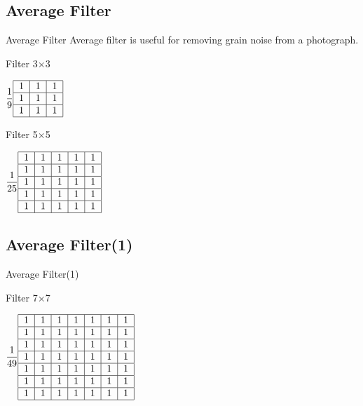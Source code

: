 \documentclass{beamer}
\begin{document}
\subsection{Average Filter}
\begin{frame}{Average Filter}
Average filter is useful for removing grain noise from a photograph.


\vspace{1cm}
\begin{center}

	Filter 3$\times$3
	
	$\dfrac{1}{9}\begin{tabular}{|c|c|c|}
	\hline 
	1 & 1 & 1 \\ 
	\hline 
	1 & 1 & 1 \\ 
	\hline 
	1 & 1 & 1 \\ 
	\hline 
	\end{tabular}$ 	
\end{center}

\begin{center}
	Filter 5$\times$5
	
	$\dfrac{1}{25}\begin{tabular}{|c|c|c|c|c|}
	\hline 
	1 & 1 & 1 & 1 & 1 \\ 
	\hline 
	1 & 1 & 1 & 1 & 1 \\ 
	\hline 
	1 & 1 & 1 & 1 & 1 \\ 
	\hline 
	1 & 1 & 1 & 1 & 1 \\ 
	\hline 
	1 & 1 & 1 & 1 & 1 \\ 
	\hline 
	\end{tabular} $
\end{center}



\end{frame}

\subsection{Average Filter(1)}
\begin{frame}{Average Filter(1)}
\begin{center}
	Filter 7$\times$7
	
	$\dfrac{1}{49}\begin{tabular}{|c|c|c|c|c|c|c|}
	\hline 
	1 & 1 & 1 & 1 & 1 & 1 & 1 \\ 
	\hline 
	1 & 1 & 1 & 1 & 1 & 1 & 1 \\ 
	\hline 
	1 & 1 & 1 & 1 & 1 & 1 & 1 \\ 
	\hline 
	1 & 1 & 1 & 1 & 1 & 1 & 1 \\ 
	\hline 
	1 & 1 & 1 & 1 & 1 & 1 & 1 \\ 
	\hline 
	1 & 1 & 1 & 1 & 1 & 1 & 1 \\ 
	\hline 
	1 & 1 & 1 & 1 & 1 & 1 & 1 \\ 
	\hline 
	\end{tabular} $
\end{center}
\end{frame}
\end{document}
